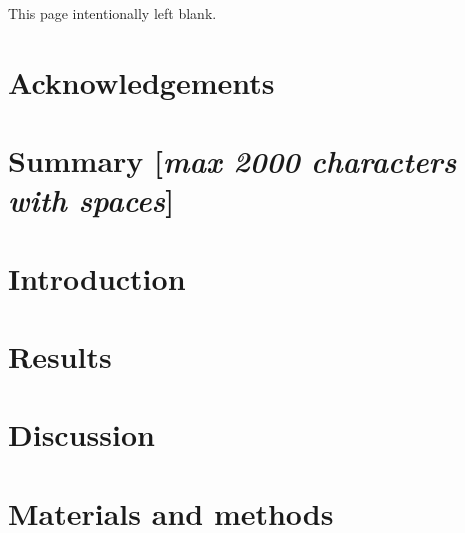 \documentclass[a4paper, oneside, 12pt]{report}
\begin{document}


\setmainfont{Times New Roman}

\vspace*{\fill}
\hfill
\begin{center}
This page intentionally left blank.
\end{center}
\vspace{\fill}
\null\newpage

\chapter*{Acknowledgements}
\clearpage

\tableofcontents

\listoffigures

\listoftables

\glsunsetall
\renewcommand*{\glossarypreamble}{\vspace*{-2em}}
\printnoidxglossary[type=\acronymtype, title={Abbreviations},nonumberlist]

\setcounter{secnumdepth}{-2}
\vspace*{-2em}
\chapter{Summary [\emph{max 2000 characters with spaces}]}

\setcounter{secnumdepth}{2}

\clearpage
\chapter{Introduction}
\vspace{-1em}
\lipsum

\chapter{Results}


\chapter{Discussion}


\chapter{Materials and methods}

\end{document}

